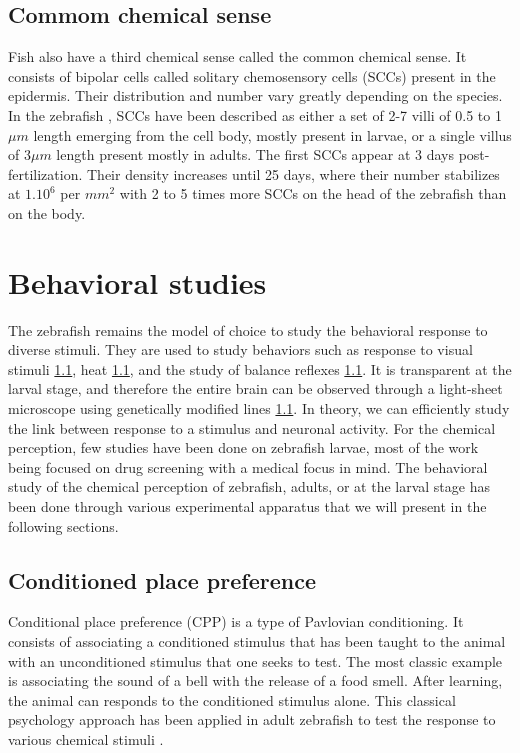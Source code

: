     \subsection{Commom  chemical sense}
    Fish also have a third chemical sense called the common chemical sense. It consists of bipolar cells called solitary chemosensory cells (SCCs) present in the epidermis. Their distribution and number vary greatly depending on the species.
    In the zebrafish \cite{kotrschal1997ontogeny}, SCCs have been described as either a set of 2-7 villi of 0.5 to 1 $\mu m$ length emerging from the cell body, mostly present in larvae, or a single villus of $3\mu m$ length present mostly in adults.
    The first SCCs appear at 3 days post-fertilization. Their density increases until 25 days, where their number stabilizes at $1.10^6$ per $mm^2$ with 2 to 5 times more SCCs on the head of the zebrafish than on the body.

  \section{Behavioral studies}
  The zebrafish remains the model of choice to study the behavioral response to diverse stimuli.  They are used to study behaviors such as response to visual stimuli \ref{}, heat \ref{}, and the study of balance reflexes \ref{}. It is transparent at the larval stage, and therefore the entire brain can be observed through a light-sheet microscope using genetically modified lines \ref{}. In theory, we can efficiently study the link between response to a stimulus and neuronal activity.
  For the chemical perception, few studies have been done on zebrafish larvae, most of the work being focused on drug screening with a medical focus in mind. The behavioral study of the chemical perception of zebrafish, adults, or at the larval stage has been done through various experimental apparatus that we will present in the following sections.

    \subsection{Conditioned place preference}
    Conditional place preference (CPP) is a type of Pavlovian conditioning. It consists of associating a conditioned stimulus that has been taught to the animal with an unconditioned stimulus that one seeks to test. The most classic example is associating the sound of a bell with the release of a food smell. After learning, the animal can responds to the conditioned stimulus alone.
    This classical psychology approach has been applied in adult zebrafish to test the response to various chemical stimuli \cite{mathur2011conditioned}.

